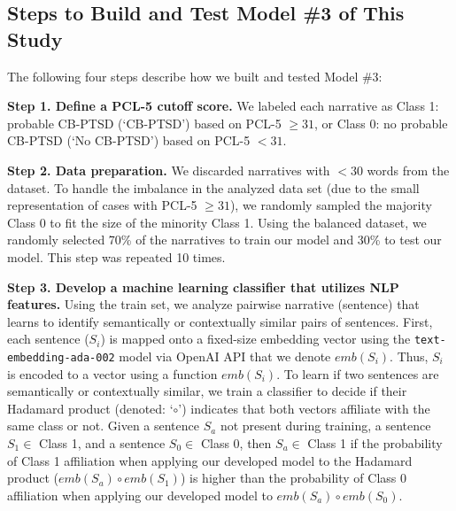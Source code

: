 \documentclass[bst/sn-nature]{sn-jnl}%
\theoremstyle{thmstyleone}%
\theoremstyle{thmstyletwo}%
\theoremstyle{thmstylethree}%
\begin{document}
\begin{appendices}
\section{Steps to Build and Test Model \#3 of This Study}
\label{secA1}
The following four steps describe how we built and tested Model \#3:

\textbf{Step 1. Define a PCL-5 cutoff score.} 
We labeled each narrative as Class 1: probable CB-PTSD (`CB-PTSD') based on PCL-5 $\geq 31$, or Class 0: no probable CB-PTSD (`No CB-PTSD') based on PCL-5 $<31$.

\textbf{Step 2. Data preparation.}
We discarded narratives with $< 30$ words from the dataset. 
To handle the imbalance in the analyzed data set (due to the small representation of cases with PCL-5 $\geq 31$), we randomly sampled the majority Class 0 to fit the size of the minority Class 1.
Using the balanced dataset, we randomly selected 70\% of the narratives to train our model and 30\% to test our model.
This step was repeated 10 times.

\textbf{Step 3. Develop a machine learning classifier that utilizes NLP features.}
Using the train set, we analyze pairwise narrative (sentence) that learns to identify semantically or contextually similar pairs of sentences.
First, each sentence ($S_i$) is mapped onto a fixed-size embedding vector using the \texttt{text-embedding-ada-002} model via OpenAI API that we denote $emb(S_i)$. 
Thus, $S_i$ is encoded to a vector using a function $emb(S_i)$.
To learn if two sentences are semantically or contextually similar, we train a classifier to decide if their Hadamard product (denoted: `$\circ$') \cite{davis1962norm} indicates that both vectors affiliate with the same class or not.
Given a sentence $S_a$ not present during training, a sentence $S_1 \in$ Class 1, and a sentence $S_0 \in$ Class 0, then $S_a \in$ Class 1 if the probability of Class 1 affiliation when applying our developed model to the Hadamard product ($emb(S_a)\circ emb(S_1)$) is higher than the probability of Class 0 affiliation when applying our developed model to $emb(S_a)\circ emb(S_0)$.


\end{appendices}
\end{document}
